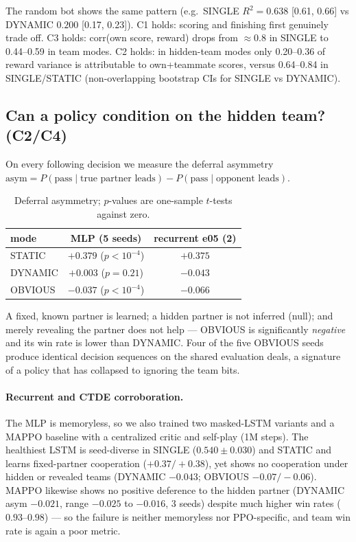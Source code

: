 \documentclass{article}
\begin{document}
The random bot shows the same pattern (e.g.\ SINGLE $R^2 = 0.638$ [0.61, 0.66]
vs DYNAMIC $0.200$ [0.17, 0.23]). C1 holds: scoring and finishing first
genuinely trade off. C3 holds: corr(own score, reward) drops from $\approx$0.8
in SINGLE to 0.44--0.59 in team modes. C2 holds: in hidden-team modes only
0.20--0.36 of reward variance is attributable to own+teammate scores, versus
0.64--0.84 in SINGLE/STATIC (non-overlapping bootstrap CIs for SINGLE vs
DYNAMIC).

\subsection{Can a policy condition on the hidden team? (C2/C4)}
\label{sec:conditioning}
On every following decision we measure the deferral asymmetry
$\mathrm{asym} = P(\text{pass} \mid \text{true partner leads}) -
P(\text{pass} \mid \text{opponent leads})$.

\begin{table}[t]
\centering
\small
\caption{Deferral asymmetry; $p$-values are one-sample $t$-tests against zero.}
\label{tab:conditioning}
\begin{tabular}{lcc}
\toprule
mode & MLP (5 seeds) & recurrent e05 (2) \\
\midrule
STATIC & $+0.379$ ($p<10^{-4}$) & $+0.375$ \\
DYNAMIC & $+0.003$ ($p=0.21$) & $-0.043$ \\
OBVIOUS & $-0.037$ ($p<10^{-4}$) & $-0.066$ \\
\bottomrule
\end{tabular}
\end{table}

A fixed, known partner is learned; a hidden partner is not inferred (null); and
merely revealing the partner does not help --- OBVIOUS is significantly
\emph{negative} and its win rate is lower than DYNAMIC. Four of the five
OBVIOUS seeds produce identical decision sequences on the shared evaluation
deals, a signature of a policy that has collapsed to ignoring the team bits.

\paragraph{Recurrent and CTDE corroboration.} The MLP is memoryless, so we also
trained two masked-LSTM variants and a MAPPO baseline with a centralized critic
and self-play (1M steps). The healthiest LSTM is seed-diverse in SINGLE
($0.540 \pm 0.030$) and STATIC and learns fixed-partner cooperation
($+0.37/+0.38$), yet shows no cooperation under hidden or revealed teams
(DYNAMIC $-0.043$; OBVIOUS $-0.07/-0.06$). MAPPO likewise shows no positive
deference to the hidden partner (DYNAMIC asym $-0.021$, range $-0.025$ to
$-0.016$, 3 seeds) despite much higher win rates ($0.93$--$0.98$) --- so the
failure is neither memoryless nor PPO-specific, and team win rate is again a
poor metric.
\end{document}
